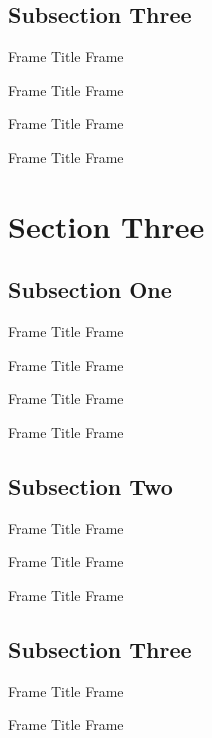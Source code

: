 \documentclass[12pt,xcolor={rgb}]{beamer}
\begin{document}
\subsection{Subsection Three}

\begin{frame}{Frame Title}
Frame \insertframenumber
\end{frame}

\begin{frame}{Frame Title}
Frame \insertframenumber
\end{frame}

\begin{frame}{Frame Title}
Frame \insertframenumber
\end{frame}

\begin{frame}{Frame Title}
Frame \insertframenumber
\end{frame}

\section{Section Three}

\subsection{Subsection One}

\begin{frame}{Frame Title}
Frame \insertframenumber
\end{frame}

\begin{frame}{Frame Title}
Frame \insertframenumber
\end{frame}

\begin{frame}{Frame Title}
Frame \insertframenumber
\end{frame}

\begin{frame}{Frame Title}
Frame \insertframenumber
\end{frame}

\subsection{Subsection Two}

\begin{frame}{Frame Title}
Frame \insertframenumber
\end{frame}

\begin{frame}{Frame Title}
Frame \insertframenumber
\end{frame}

\begin{frame}{Frame Title}
Frame \insertframenumber
\end{frame}

\subsection{Subsection Three}

\begin{frame}{Frame Title}
Frame \insertframenumber
\end{frame}

\begin{frame}{Frame Title}
Frame \insertframenumber
\end{frame}
\end{document}
